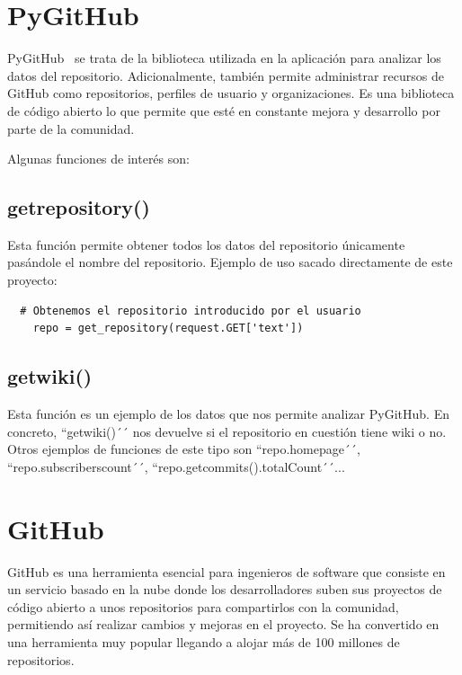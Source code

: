 \documentclass[a4paper, 12pt]{book}
\begin{document}
\section{PyGitHub}
\label{sec:pygithub}

PyGitHub~\cite{website:Pygithub} se trata de la biblioteca utilizada en la aplicación para analizar los datos del repositorio. Adicionalmente, también permite administrar recursos de GitHub como repositorios, perfiles de usuario y organizaciones. Es una biblioteca de código abierto lo que permite que esté en constante mejora y desarrollo por parte de la comunidad. 

Algunas funciones de interés son:

\subsection{get\textunderscore repository()}

Esta función permite obtener todos los datos del repositorio únicamente pasándole el nombre del repositorio. Ejemplo de uso sacado directamente de este proyecto:

 {\footnotesize
\begin{verbatim}
  # Obtenemos el repositorio introducido por el usuario
    repo = get_repository(request.GET['text'])
\end{verbatim}
}

\subsection{get\textunderscore wiki()}

Esta función es un ejemplo de los datos que nos permite analizar PyGitHub. En concreto, ``getwiki()´´ nos devuelve si el repositorio en cuestión tiene wiki o no. Otros ejemplos de funciones de este tipo son ``repo.homepage´´, ``repo.subscriberscount´´, ``repo.getcommits().totalCount´´...

\section{GitHub}
\label{sec:github}

GitHub es una herramienta esencial para ingenieros de software que consiste en un servicio basado en la nube donde los desarrolladores suben sus proyectos de código abierto a unos repositorios para compartirlos con la comunidad, permitiendo así realizar cambios y mejoras en el proyecto. Se ha convertido en una herramienta muy popular llegando a alojar más de 100 millones de repositorios.
\end{document}
